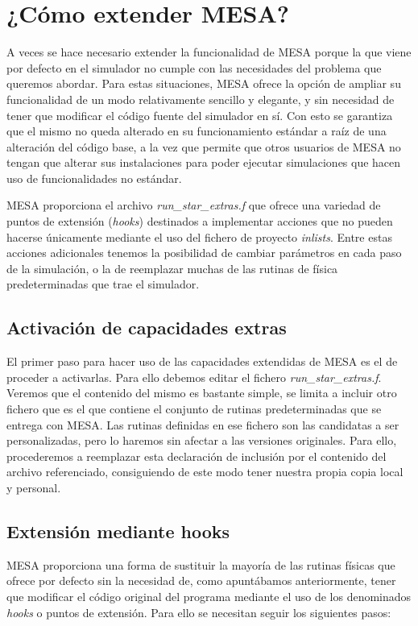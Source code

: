 \section{¿Cómo extender MESA?}
A veces se hace necesario extender la funcionalidad de MESA porque la que viene por defecto en el simulador no cumple con las necesidades del problema que queremos abordar. Para estas situaciones, MESA ofrece la opción de ampliar su funcionalidad de un modo relativamente sencillo y elegante, y sin necesidad de tener que modificar el código fuente del simulador en sí. Con esto se garantiza que el mismo no queda alterado en su funcionamiento estándar a raíz de una alteración del código base, a la vez que permite que otros usuarios de MESA no tengan que alterar sus instalaciones para poder ejecutar simulaciones que hacen uso de funcionalidades no estándar. \par

MESA proporciona el archivo \textit{run\_star\_extras.f} que ofrece una variedad de puntos de extensión (\textit{hooks}) destinados a implementar acciones que no pueden hacerse únicamente mediante el uso del fichero de proyecto \textit{inlists}. Entre estas acciones adicionales tenemos la posibilidad de cambiar parámetros en cada paso de la simulación, o la de reemplazar muchas de las rutinas de física predeterminadas que trae el simulador.\par

\subsection{Activación de capacidades extras}
El primer paso para hacer uso de las capacidades extendidas de MESA es el de proceder a activarlas. Para ello debemos editar el fichero \textit{run\_star\_extras.f}. Veremos que el contenido del mismo es bastante simple, se limita a incluir otro fichero que es el que contiene el conjunto de rutinas predeterminadas que se entrega con MESA. Las rutinas definidas en ese fichero son las candidatas a ser personalizadas, pero lo haremos sin afectar a las versiones originales. Para ello, procederemos a reemplazar esta declaración de inclusión por el contenido del archivo referenciado, consiguiendo de este modo tener nuestra propia copia local y personal.\par

\subsection{Extensión mediante hooks}
MESA proporciona una forma de sustituir la mayoría de las rutinas físicas que ofrece por defecto sin la necesidad de, como apuntábamos anteriormente, tener que modificar el código original del programa mediante el uso de los denominados \textit{hooks} o puntos de extensión. Para ello se necesitan seguir los siguientes pasos:

